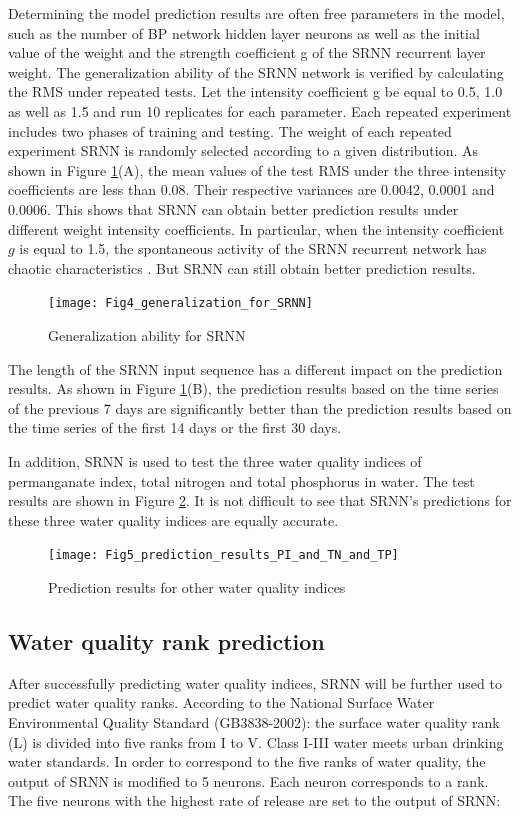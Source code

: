\documentclass[runningheads]{llncs}
\begin{document}
Determining the model prediction results are often free parameters in the model, 
such as the number of BP network hidden layer neurons as well as the initial
value of the weight and the strength coefficient g of the SRNN recurrent 
layer weight. The generalization ability of the SRNN network is verified
by calculating the RMS under repeated tests. 
Let the intensity coefficient g be equal to 0.5, 1.0 as well as 1.5 and run 10 
replicates for each parameter. Each repeated experiment includes two
phases of training and testing. The weight of each repeated experiment 
SRNN is randomly selected according to a given distribution. 
As shown in Figure \ref{Generalization ability for SRNN}(A), the mean values of the test
RMS under the three intensity coefficients are less 
than 0.08. Their respective variances are 0.0042, 0.0001 and 0.0006. This 
shows that SRNN can obtain better prediction results under different weight
intensity coefficients. In particular, when the intensity coefficient
$g$ is equal to 1.5, the spontaneous activity of the SRNN recurrent network has
chaotic characteristics \cite{RN17}. But SRNN can still obtain better prediction results.

\begin{figure}[htbp]
\centering
\texttt{[image: Fig4\_generalization\_for\_SRNN]}
\caption{Generalization ability for SRNN}
\label{Generalization ability for SRNN}
\end{figure}

The length of the SRNN input sequence has a different impact on the prediction results. 
As shown in Figure \ref{Generalization ability for SRNN}(B), the prediction 
results based on the time series of the 
previous 7 days are significantly better than the prediction results 
based on the time series of the first 14 days or the first 30 days.

In addition, SRNN is used to test the three water quality indices of 
permanganate index, total nitrogen and total phosphorus in water. 
The test results are shown in Figure \ref{Prediction results for other water quality indices}. 
It is not difficult to see that 
SRNN's predictions for these three water quality indices are equally accurate.
\begin{figure}[htbp]
\centering
\texttt{[image: Fig5\_prediction\_results\_PI\_and\_TN\_and\_TP]}
\caption{Prediction results for other water quality indices}
\label{Prediction results for other water quality indices}
\end{figure}

\subsection{Water quality rank prediction}
After successfully predicting water quality indices, 
SRNN will be further used to predict water quality ranks. 
According to the National Surface Water Environmental Quality Standard (GB3838-2002): 
the surface water quality rank (L) is divided into 
five ranks from I to V. Class I-III water meets urban drinking water standards. 
In order to correspond to the five ranks of water quality, the output of 
SRNN is modified to 5 neurons. Each neuron corresponds to a rank. 
The five neurons with the highest rate of release are set to the output of SRNN:
\end{document}
